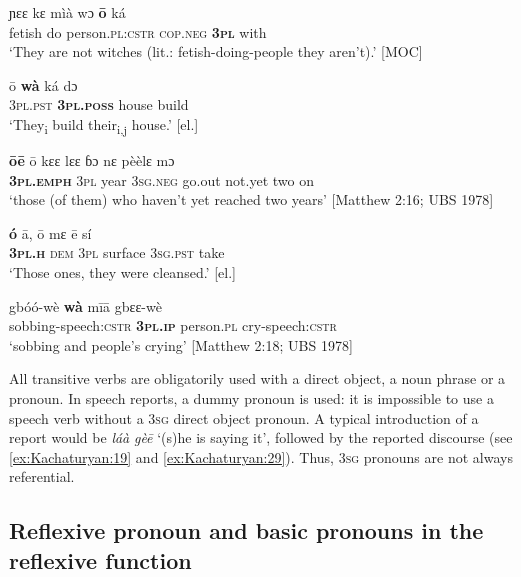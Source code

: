 \documentclass[output=paper]{langscibook}
\begin{document}
 \ea
\label{ex:Kachaturyan:5}
    \ea
    \label{ex:Kachaturyan:5a} 
    \gll ɲɛɛ  kɛ  mìà  wɔ  \textbf{ō}  ká\\
     fetish  do  person.\textsc{pl:cstr}  \textsc{cop.neg}  \textbf{\textsc{3pl}}  with\\
    \glt ‘They are not witches (lit.: fetish-doing-people they aren’t).’ [MOC]
 
    \ex
    \label{ex:Kachaturyan:5b} 
    \gll ō  \textbf{wà}    ká    dɔ\\
     3\textsc{pl.pst}  \textbf{\textsc{3pl.poss}}  house    build\\
    \glt ‘They\textsubscript{i} build their\textsubscript{i,j} house.’ [el.]
 
    \ex
    \label{ex:Kachaturyan:5c} 
    \gll \textbf{ōē}  ō  kɛɛ  lɛɛ  ɓɔ  nɛ  pèèlɛ  mɔ\\
     \textbf{3\textsc{pl.emph}  }\textsc{3pl}  year  3\textsc{sg.neg}  go.out  not.yet  two  on\\
    \glt ‘those (of them) who haven’t yet reached two years’ [Matthew 2:16; UBS 1978]

    \ex
    \label{ex:Kachaturyan:5d}
    \gll \textbf{ó}  ā,  ō  mɛ  ē  sí\\
     \textbf{3\textsc{pl.h}} \textsc{dem} \textsc{3pl} surface \textsc{3sg.pst} take\\
\glt ‘Those ones, they were cleansed.’ [el.]

    \ex
    \label{ex:Kachaturyan:5e}
    \gll gbóó-wè  \textbf{wà}    mīā  gbɛɛ-wè\\
     sobbing-speech:\textsc{cstr}    \textbf{\textsc{3pl.ip}}  person\textsc{.pl}  cry-speech:\textsc{cstr}\\
\glt ‘sobbing and people’s crying’ [Matthew 2:18; UBS 1978]
\z
\z

All transitive verbs are obligatorily used with a direct object, a noun phrase or a pronoun. In speech reports, a dummy pronoun is used: it is impossible to use a speech verb without a 3\textsc{sg} direct object pronoun. A typical introduction of a report would be \textit{láà} \textit{gèē} ‘(s)he is saying it’, followed by the reported discourse (see \ref{ex:Kachaturyan:19} and \ref{ex:Kachaturyan:29}). Thus, 3\textsc{sg} pronouns are not always referential.


 
 \subsection{Reflexive pronoun and basic pronouns in the reflexive function}\label{sec:Kachaturyan:3.2}
\end{document}
